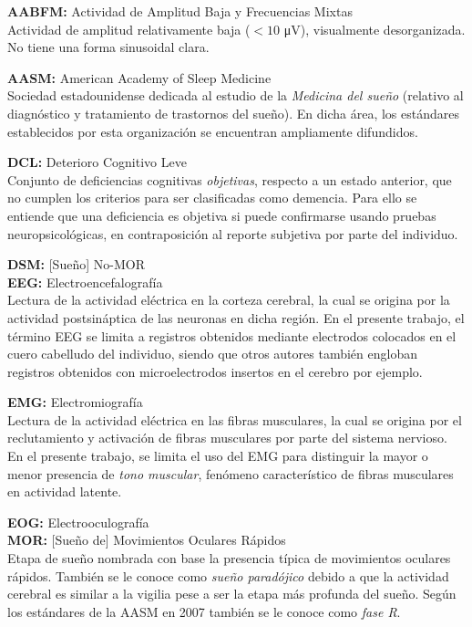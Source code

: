 \documentclass[12pt,letterpaper]{book}
\newcommand{\mv}{\si{\micro\volt}\xspace}
\begin{document}
{
\setlength{\leftskip}{2em}
\setlength{\parindent}{-2em}

\textbf{AABFM:} Actividad de Amplitud Baja y Frecuencias Mixtas \\
Actividad de amplitud relativamente baja ($<10$ \mv), visualmente desorganizada.
No tiene una forma sinusoidal clara.

\textbf{AASM:} American Academy of Sleep Medicine \\
Sociedad estadounidense dedicada al estudio de la \textit{Medicina del sueño} (relativo al 
diagnóstico y tratamiento de trastornos del sueño).
En dicha área, los estándares establecidos por esta organización se encuentran ampliamente 
difundidos.

\textbf{DCL:} Deterioro Cognitivo Leve \\
Conjunto de deficiencias cognitivas \textit{objetivas}, respecto a un estado anterior, que no cumplen los criterios para ser clasificadas como demencia. 
Para ello se entiende que una deficiencia es objetiva si puede confirmarse usando pruebas neuropsicológicas, en contraposición al reporte subjetiva por parte del individuo.

\textbf{DSM:} [Sueño] No-MOR \\

\textbf{EEG:}  Electroencefalografía \\
Lectura de la actividad eléctrica en la corteza cerebral, la cual se origina por la actividad postsináptica de las neuronas en dicha región. 
En el presente trabajo, el término EEG se limita a registros obtenidos mediante electrodos colocados en el cuero cabelludo del individuo, siendo que otros autores también engloban registros obtenidos con microelectrodos insertos en el cerebro por ejemplo.

\textbf{EMG:}  Electromiografía \\
Lectura de la actividad eléctrica en las fibras musculares, la cual se origina por el reclutamiento y activación de fibras musculares por parte del sistema nervioso.
En el presente trabajo, se limita el uso del EMG para distinguir la mayor o menor presencia de \textit{tono muscular}, fenómeno característico de fibras musculares en actividad latente.

\textbf{EOG:}  Electrooculografía \\

\textbf{MOR:} [Sueño de] Movimientos Oculares Rápidos \\
Etapa de sueño nombrada con base la presencia típica de movimientos oculares rápidos. También se le conoce como \textit{sueño paradójico} debido a que la actividad cerebral es similar a la vigilia pese a ser la etapa más profunda del sueño. Según los estándares de la AASM en 2007 también se le conoce como \textit{fase R}.

}
\end{document}
